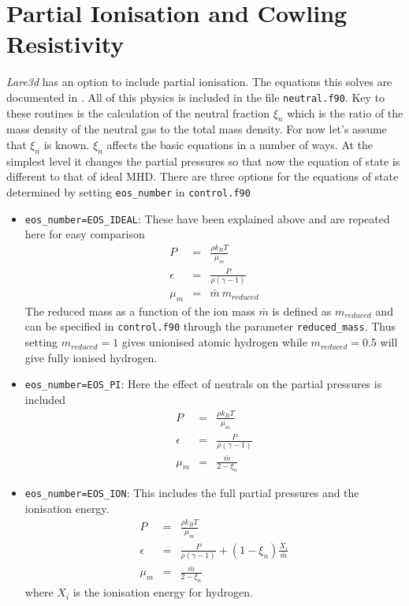\documentclass[11pt]{article}
\begin{document}
\section{Partial Ionisation and Cowling Resistivity}
{\it Lare3d} has an option to include partial ionisation. The equations this solves are documented in \cite{flux-emergence}. All of this physics is included in the file \texttt{neutral.f90}. Key to these routines is the calculation of the neutral fraction $\xi_n$ which is the ratio of the mass density of the neutral gas to the total mass density. For now let's assume that $\xi_n$ is known. $\xi_n$ affects the basic equations in a number of ways. At the simplest level it changes the partial pressures so that now the equation of state is different to that of ideal MHD. There are three options for the equations of state determined by setting \texttt{eos\_number} in \texttt{control.f90} 
\begin{itemize}
\item \texttt{eos\_number=EOS\_IDEAL}: These have been explained above and are repeated here for easy comparison
\begin{eqnarray*}
P&=&\frac{\rho k_{B}T}{\mu_m}\\
\epsilon&=&\frac{P}{\rho(\gamma-1)}\\
\mu_m&=&\bar{m}\ m_{reduced}
\end{eqnarray*} 
The reduced mass as a function of the ion mass $\bar{m}$ is defined as $m_{reduced}$ and can be specified in \texttt{control.f90} through the parameter \texttt{reduced\_mass}. Thus setting $m_{reduced}=1$ gives unionised atomic hydrogen while $m_{reduced}=0.5$ will give fully ionised hydrogen. 

\item \texttt{eos\_number=EOS\_PI}: Here the effect of neutrals on the partial pressures is included 
\begin{eqnarray*}
P&=&\frac{\rho k_{B}T}{\mu_m}\\
\epsilon&=&\frac{P}{\rho(\gamma-1)}\\
\mu_m&=&\frac{\bar{m}}{2-\xi_n}
\end{eqnarray*}

\item \texttt{eos\_number=EOS\_ION}: This includes the full partial pressures and the ionisation energy.
\begin{eqnarray*}
P&=&\frac{\rho k_{B}T}{\mu_m}\\
\epsilon&=&\frac{P}{\rho(\gamma-1)}+(1-\xi_n)\frac{X_i}{\bar{m}}\\
\mu_m&=&\frac{\bar{m}}{2-\xi_n}
\end{eqnarray*}
where $X_i$ is the ionisation energy for hydrogen.

\end{itemize}
\end{document}

